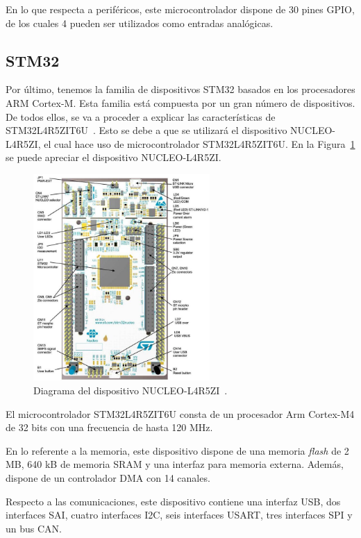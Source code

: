En lo que respecta a periféricos, este microcontrolador dispone de 30 pines \ac{GPIO}, de los cuales 4 pueden ser utilizados como entradas analógicas.


\subsection{STM32}\label{subsec:stm32}

Por último, tenemos la familia de dispositivos STM32 basados en los procesadores ARM Cortex-M.
Esta familia está compuesta por un gran número de dispositivos.
De todos ellos, se va a proceder a explicar las características de STM32L4R5ZIT6U~\cite{nucleo-spec}.
Esto se debe a que se utilizará el dispositivo NUCLEO-L4R5ZI, el cual hace uso de microcontrolador STM32L4R5ZIT6U.
En la Figura~\ref{fig:nucleo-l4r5zi} se puede apreciar el dispositivo NUCLEO-L4R5ZI.

\begin{figure}[h]
    \centering
    \includegraphics[width=0.6\textwidth]{figures/nucleo-l4r5zi.jpg}
    \caption{Diagrama del dispositivo NUCLEO-L4R5ZI~\cite{nucleo-img}.}
    \label{fig:nucleo-l4r5zi}
\end{figure}

El microcontrolador STM32L4R5ZIT6U consta de un procesador Arm Cortex-M4 de 32 bits con una frecuencia de hasta 120 MHz.

En lo referente a la memoria, este dispositivo dispone de una memoria \textit{flash} de 2 MB, 640 kB de memoria SRAM y una interfaz para memoria externa.
Además, dispone de un controlador \ac{DMA} con 14 canales.

Respecto a las comunicaciones, este dispositivo contiene una interfaz \ac{USB}, dos interfaces \ac{SAI}, cuatro interfaces \ac{I2C}, seis interfaces \ac{USART}, tres interfaces \ac{SPI} y un bus \ac{CAN}.




